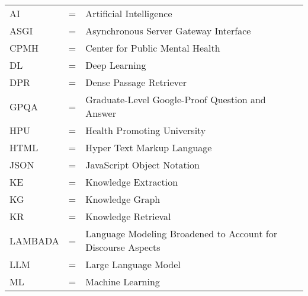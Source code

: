 \begin{tabular}{llp{3in}}
	AI      & \hspace{1.5cm} = & Artificial Intelligence                                      \\
	ASGI    & \hspace{1.5cm} = & Asynchronous Server Gateway Interface                        \\
	CPMH    & \hspace{1.5cm} = & Center for Public Mental Health                              \\
	DL      & \hspace{1.5cm} = & Deep Learning                                                \\
	DPR     & \hspace{1.5cm} = & Dense Passage Retriever                                      \\
	GPQA    & \hspace{1.5cm} = & Graduate-Level Google-Proof Question and Answer              \\
	HPU     & \hspace{1.5cm} = & Health Promoting University                                  \\
	HTML    & \hspace{1.5cm} = & Hyper Text Markup Language                                   \\
	JSON    & \hspace{1.5cm} = & JavaScript Object Notation                                   \\
	KE      & \hspace{1.5cm} = & Knowledge Extraction                                         \\
	KG      & \hspace{1.5cm} = & Knowledge Graph                                              \\
	KR      & \hspace{1.5cm} = & Knowledge Retrieval                                          \\
	LAMBADA & \hspace{1.5cm} = & Language Modeling Broadened to Account for Discourse Aspects \\
	LLM     & \hspace{1.5cm} = & Large Language Model                                         \\
	ML      & \hspace{1.5cm} = & Machine Learning                                             \\

\end{tabular}
